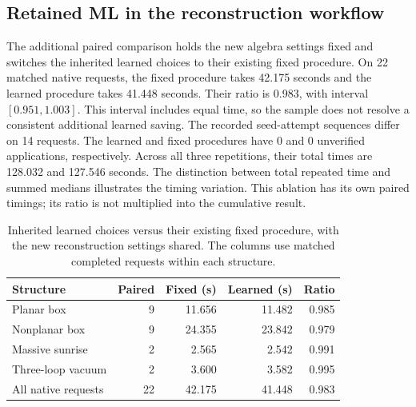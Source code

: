 \documentclass[11pt,a4paper]{article}
\begin{document}
\subsection{Retained ML in the reconstruction workflow}
The additional paired comparison holds the new algebra settings fixed and switches the inherited learned choices to their existing fixed procedure. On 22 matched native requests, the fixed procedure takes 42.175 seconds and the learned procedure takes 41.448 seconds. Their ratio is 0.983, with interval $[0.951,1.003]$. This interval includes equal time, so the sample does not resolve a consistent additional learned saving. The recorded seed-attempt sequences differ on 14 requests. The learned and fixed procedures have 0 and 0 unverified applications, respectively. Across all three repetitions, their total times are 128.032 and 127.546 seconds. The distinction between total repeated time and summed medians illustrates the timing variation. This ablation has its own paired timings; its ratio is not multiplied into the cumulative result.

\begin{table}[!htbp]\centering\small
\caption{Inherited learned choices versus their existing fixed procedure, with the new reconstruction settings shared. The columns use matched completed requests within each structure.}
\label{notes-reconstruction-tab:reconstruction-retained}
\begin{tabularx}{\linewidth}{@{}Yrrrr@{}}\toprule
Structure & Paired & Fixed (s) & Learned (s) & Ratio\\\midrule
Planar box & 9 & 11.656 & 11.482 & 0.985 \\
Nonplanar box & 9 & 24.355 & 23.842 & 0.979 \\
Massive sunrise & 2 & 2.565 & 2.542 & 0.991 \\
Three-loop vacuum & 2 & 3.600 & 3.582 & 0.995 \\
All native requests & 22 & 42.175 & 41.448 & 0.983 \\
\bottomrule\end{tabularx}\end{table}
\end{document}
